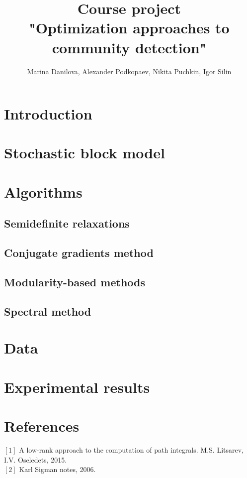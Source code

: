 \documentclass[11pt,a4paper]{extarticle}
\title{Course project \\
"Optimization approaches to community detection"}
\author{ Marina Danilova, Alexander Podkopaev, Nikita Puchkin, Igor Silin }
\begin{document}
\maketitle

\section{Introduction}

\section{Stochastic block model}

\section{Algorithms}
	
	\subsection{Semidefinite relaxations}
	\subsection{Conjugate gradients method}
	\subsection{Modularity-based methods}
	\subsection{Spectral method}

\section{Data}

\section{Experimental results}


\section{References}
     $[1]$  A low-rank approach to the computation of path integrals. M.S. Litsarev, I.V. Oseledets, 2015.\\
     $[2]$ Karl Sigman notes, 2006.\\
\end{document}

